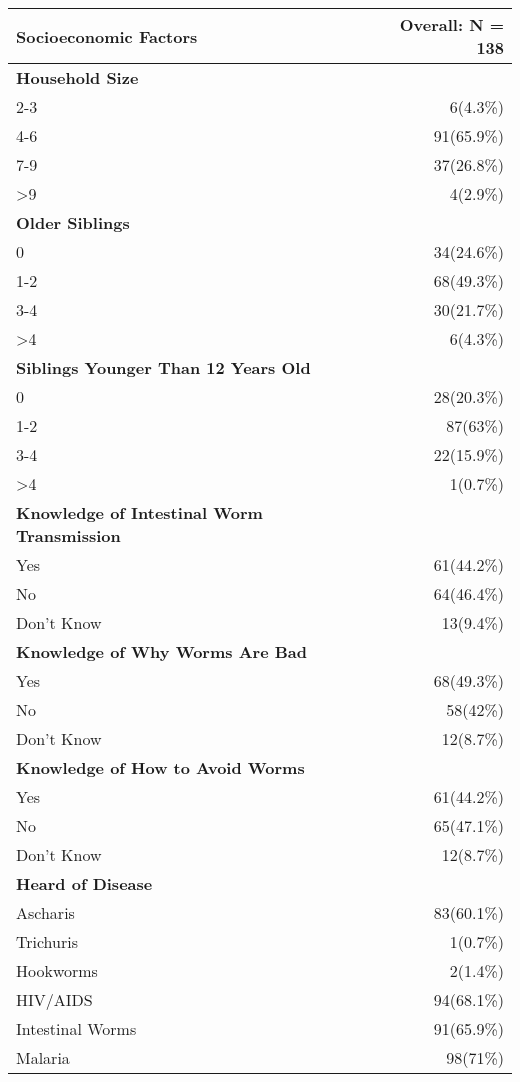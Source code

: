 \documentclass[4pt,letterpaper]{article}
\begin{document}
\begin{multicols}{2}
\begin{center}
\begin{tabular}{p{5cm}r}
\toprule
\textbf{Socioeconomic Factors} & \textbf{Overall: N = 138} \\
\midrule
\textbf{Household Size} & \\
2-3 & 6(4.3\%) \\
4-6 & 91(65.9\%) \\
7-9 & 37(26.8\%) \\
\textgreater 9 & 4(2.9\%) \\
\midrule
\textbf{Older Siblings} & \\
0 & 34(24.6\%) \\
1-2 & 68(49.3\%) \\
3-4 & 30(21.7\%) \\
\textgreater 4 & 6(4.3\%) \\
\midrule
\textbf{Siblings Younger Than 12 Years Old} & \\
0 & 28(20.3\%) \\
1-2 & 87(63\%) \\
3-4 & 22(15.9\%) \\
\textgreater 4 & 1(0.7\%) \\
\midrule
\textbf{Knowledge of Intestinal Worm Transmission} & \\
Yes & 61(44.2\%) \\
No & 64(46.4\%) \\
Don't Know & 13(9.4\%) \\
\midrule
\textbf{Knowledge of Why Worms Are Bad} & \\
Yes & 68(49.3\%) \\
No & 58(42\%) \\
Don't Know & 12(8.7\%) \\
\midrule
\textbf{Knowledge of How to Avoid Worms} & \\
Yes & 61(44.2\%) \\
No & 65(47.1\%) \\
Don't Know & 12(8.7\%) \\
\midrule
\textbf{Heard of Disease} & \\
Ascharis & 83(60.1\%) \\
Trichuris & 1(0.7\%) \\
Hookworms & 2(1.4\%) \\
HIV/AIDS & 94(68.1\%) \\
Intestinal Worms & 91(65.9\%) \\
Malaria & 98(71\%) \\

\end{tabular}
\end{center}
\end{multicols}
\end{document}
